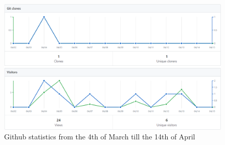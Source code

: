 \documentclass{subfiles}
\begin{document}
 	\begin{figure} [h!]
 		\centering
 		\includegraphics[width=\textwidth]{img/githupStatistics}
 		\caption{{\color{blue}Github statistics from the 4th of March till the 14th of April}}
 		\label{fig:githupStatistics}
 	\end{figure}
 	
\end{document}
